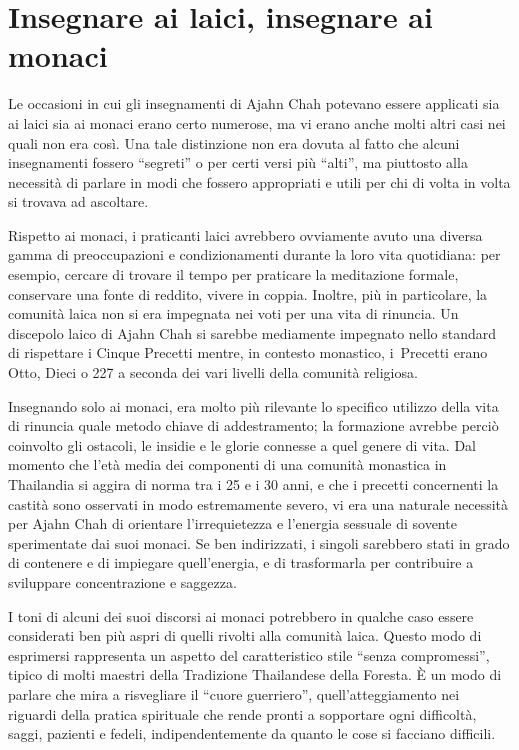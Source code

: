 \section{Insegnare ai laici, insegnare ai monaci}

Le occasioni in cui gli insegnamenti di Ajahn Chah potevano essere
applicati sia ai laici sia ai monaci erano certo numerose, ma vi erano
anche molti altri casi nei quali non era così. Una tale distinzione non
era dovuta al fatto che alcuni insegnamenti fossero ``segreti'' o per
certi versi più ``alti'', ma piuttosto alla necessità di parlare in modi
che fossero appropriati e utili per chi di volta in volta si trovava ad
ascoltare.

Rispetto ai monaci, i praticanti laici avrebbero ovviamente avuto una
diversa gamma di preoccupazioni e condizionamenti durante la loro vita
quotidiana: per esempio, cercare di trovare il tempo per praticare la
meditazione formale, conservare una fonte di reddito, vivere in coppia.
Inoltre, più in particolare, la comunità laica non si era impegnata nei
voti per una vita di rinuncia. Un discepolo laico di Ajahn Chah si
sarebbe mediamente impegnato nello \mbox{standard} di rispettare i Cinque
Precetti mentre, in contesto monastico, i~Precetti erano Otto, Dieci o
227 a seconda dei vari livelli della comunità religiosa.

Insegnando solo ai monaci, era molto più rilevante lo specifico utilizzo
della vita di rinuncia quale metodo chiave di addestramento; la
formazione avrebbe perciò coinvolto gli ostacoli, le insidie e le glorie
connesse a quel genere di vita. Dal momento che l'età media dei
componenti di una comunità monastica in Thailandia si aggira di norma
tra i 25 e i 30 anni, e che i precetti concernenti la castità sono
osservati in modo estremamente severo, vi era una naturale necessità per
Ajahn Chah di orientare l'irrequietezza e l'energia sessuale di sovente
sperimentate dai suoi monaci. Se ben indirizzati, i singoli sarebbero
stati in grado di contenere e di impiegare quell'energia, e di
trasformarla per contribuire a sviluppare concentrazione e saggezza.

I toni di alcuni dei suoi discorsi ai monaci potrebbero in qualche caso
essere considerati ben più aspri di quelli rivolti alla comunità laica.
Questo modo di esprimersi rappresenta un aspetto del caratteristico
stile ``senza compromessi'', tipico di molti maestri della Tradizione
Thailandese della Foresta. È un modo di parlare che mira a risvegliare
il ``cuore guerriero'', quell'atteggiamento nei riguardi della pratica
spirituale che rende pronti a sopportare ogni difficoltà, saggi,
pazienti e fedeli, indipendentemente da quanto le cose si facciano
difficili.

